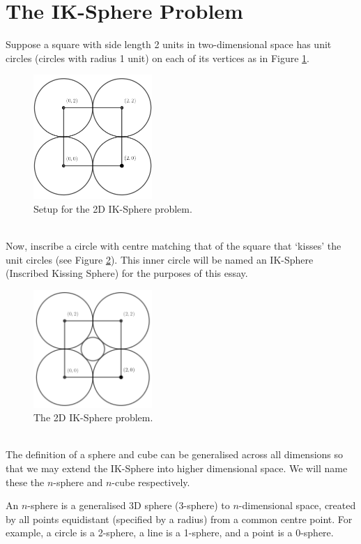 \section{The IK-Sphere Problem}
Suppose a square with side length 2 units in two-dimensional space has unit circles (circles with radius 1 unit) on each of its vertices as in Figure \ref{fig:2d_Setup_IK_Sphere}.
\begin{figure}[h]
    \centering
    \includegraphics[width=0.4\textwidth]{images/2D.png}
    \caption{\label{fig:2d_Setup_IK_Sphere}Setup for the 2D IK-Sphere problem.}
\end{figure}
\\Now, inscribe a circle with centre matching that of the square that `kisses' the unit circles (see Figure \ref{fig:2d_IK_Sphere}). This inner circle will be named an IK-Sphere (Inscribed Kissing Sphere) for the purposes of this essay.
\begin{figure}[h]
    \centering
    \includegraphics[width=0.4\textwidth]{images/2D IK.png}
    \caption{\label{fig:2d_IK_Sphere}The 2D IK-Sphere problem.}
\end{figure}
\\The definition of a sphere and cube can be generalised across all dimensions so that we may extend the IK-Sphere into higher dimensional space. We will name these the $n$-sphere and $n$-cube respectively.

\begin{definition}[$n$-Sphere]\label{def:n-sphere}
    An $n$-sphere is a generalised 3D sphere (3-sphere) to $n$-dimensional space, created by all points equidistant (specified by a radius) from a common centre point. For example, a circle is a 2-sphere, a line is a 1-sphere, and a point is a 0-sphere.
\end{definition}

